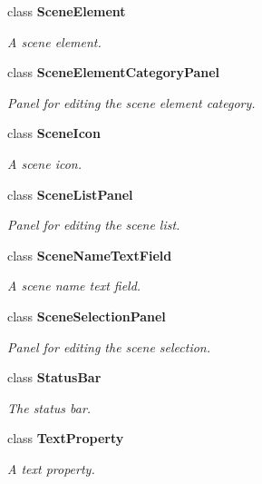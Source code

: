 \begin{DoxyCompactItemize}
class {\bf Scene\-Element}
\begin{DoxyCompactList}\small\item\em A scene element. \end{DoxyCompactList}\item 
class {\bf Scene\-Element\-Category\-Panel}
\begin{DoxyCompactList}\small\item\em Panel for editing the scene element category. \end{DoxyCompactList}\item 
class {\bf Scene\-Icon}
\begin{DoxyCompactList}\small\item\em A scene icon. \end{DoxyCompactList}\item 
class {\bf Scene\-List\-Panel}
\begin{DoxyCompactList}\small\item\em Panel for editing the scene list. \end{DoxyCompactList}\item 
class {\bf Scene\-Name\-Text\-Field}
\begin{DoxyCompactList}\small\item\em A scene name text field. \end{DoxyCompactList}\item 
class {\bf Scene\-Selection\-Panel}
\begin{DoxyCompactList}\small\item\em Panel for editing the scene selection. \end{DoxyCompactList}\item 
class {\bf Status\-Bar}
\begin{DoxyCompactList}\small\item\em The status bar. \end{DoxyCompactList}\item 
class {\bf Text\-Property}
\begin{DoxyCompactList}\small\item\em A text property. \end{DoxyCompactList}\end{DoxyCompactItemize}
